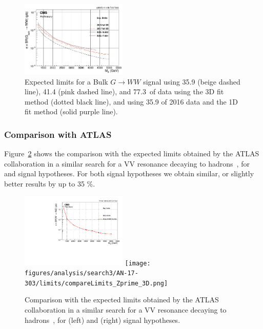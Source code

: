 \begin{figure}[h!]
\centering
\includegraphics[width=0.45\textwidth]{figures/analysis/search3/AN-17-303/limits/compareAll_BulkGWW.png}
\caption{Expected limits for a Bulk $G\rightarrow WW$ signal using 35.9 (beige dashed line), 41.4 (pink dashed line), and 77.3~\fbinv of data using the 3D fit method (dotted black line), and using 35.9 \fbinv of 2016 data and the 1D fit method (solid purple line).}
\label{fig:limitsCompare2}
\end{figure}
\subsubsection{Comparison with ATLAS}
\label{sec:limitcompareatlas}
Figure~\ref{fig:limitsCompareATLAS} shows the comparison with the expected limits obtained by the ATLAS collaboration in a similar search for a VV resonance decaying to hadrons~\cite{ATLAS-CONF-2018-016}, for \PWpr and \PZpr signal hypotheses. For both signal hypotheses we obtain similar, or slightly better results by up to 35 \%.
\begin{figure}[h!]
\centering
\includegraphics[width=0.45\textwidth]{figures/analysis/search3/AN-17-303/limits/compareLimits_Wprime_3D.pdf}
\texttt{[image: figures/analysis/search3/AN-17-303/limits/compareLimits\_Zprime\_3D.png]}
\caption{Comparison with the expected limits obtained by the ATLAS collaboration in a similar search for a VV resonance decaying to hadrons~\cite{ATLAS-CONF-2018-016}, for \PWpr (left) and \PZpr (right) signal hypotheses.}
\label{fig:limitsCompareATLAS}
\end{figure}
